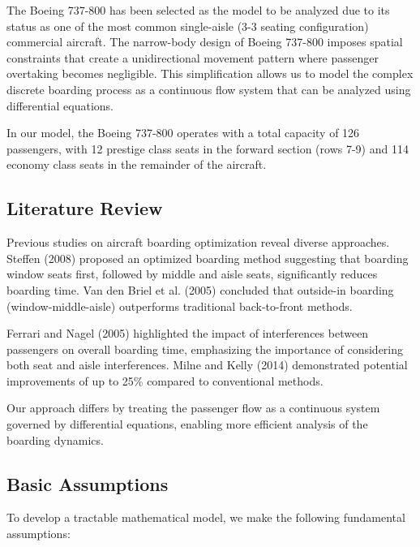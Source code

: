 \documentclass[a4paper,12pt]{article}
\begin{document}
The Boeing 737-800 has been selected as the model to be analyzed due to its status as one of the most common single-aisle (3-3 seating configuration) commercial aircraft. The narrow-body design of Boeing 737-800 imposes spatial constraints that create a unidirectional movement pattern where passenger overtaking becomes negligible. This simplification allows us to model the complex discrete boarding process as a continuous flow system that can be analyzed using differential equations.

In our model, the Boeing 737-800 operates with a total capacity of 126 passengers, with 12 prestige class seats in the forward section (rows 7-9) and 114 economy class seats in the remainder of the aircraft.

\subsection{Literature Review}

Previous studies on aircraft boarding optimization reveal diverse approaches. Steffen (2008) proposed an optimized boarding method suggesting that boarding window seats first, followed by middle and aisle seats, significantly reduces boarding time. Van den Briel et al. (2005) concluded that outside-in boarding (window-middle-aisle) outperforms traditional back-to-front methods.

Ferrari and Nagel (2005) highlighted the impact of interferences between passengers on overall boarding time, emphasizing the importance of considering both seat and aisle interferences. Milne and Kelly (2014) demonstrated potential improvements of up to 25\% compared to conventional methods.

Our approach differs by treating the passenger flow as a continuous system governed by differential equations, enabling more efficient analysis of the boarding dynamics.

\subsection{Basic Assumptions}

To develop a tractable mathematical model, we make the following fundamental assumptions:
\end{document}
